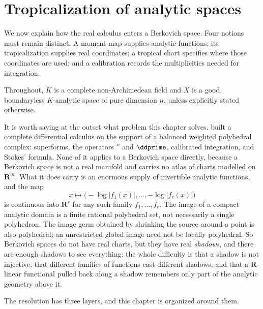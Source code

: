 \chapter{Tropicalization of analytic spaces}
\label{chap:analytic-tropicalization}

\newcommand{\sq}{\operatorname{sq}}

We now explain how the real calculus enters a Berkovich space. Four notions
must remain distinct. A moment map supplies analytic functions; its
tropicalization supplies real coordinates; a tropical chart specifies where
those coordinates are used; and a calibration records the multiplicities
needed for integration.

Throughout, $K$ is a complete non-Archimedean field and $X$ is a good,
boundaryless $K$-analytic space of pure dimension $n$, unless explicitly
stated otherwise.

It is worth saying at the outset what problem this chapter solves.
 built a
complete differential calculus on the support of a balanced weighted
polyhedral complex: superforms, the operators $\dprime$ and $\ddprime$,
calibrated integration, and Stokes' formula. None of it applies to a
Berkovich space directly, because a Berkovich space is not a real manifold
and carries no atlas of charts modelled on $\mathbf R^m$. What it does carry
is an enormous supply of invertible analytic functions, and the map
\[
 x\longmapsto\bigl(-\log|f_1(x)|,\ldots,-\log|f_r(x)|\bigr)
\]
is continuous into $\mathbf R^r$ for any such family $f_1,\ldots,f_r$. The
image of a compact analytic domain is a finite rational polyhedral set,
not necessarily a single polyhedron. The image germ obtained by shrinking
the source around a point is also polyhedral; an unrestricted global image
need not be locally polyhedral. So
Berkovich spaces do not have real charts, but they have real \emph{shadows},
and there are enough shadows to see everything: the whole difficulty is that
a shadow is not injective, that different families of functions cast
different shadows, and that a
$\mathbf R$-linear functional pulled back along a shadow remembers only part
of the analytic geometry above it.

The resolution has three layers, and this chapter is organized around them.


